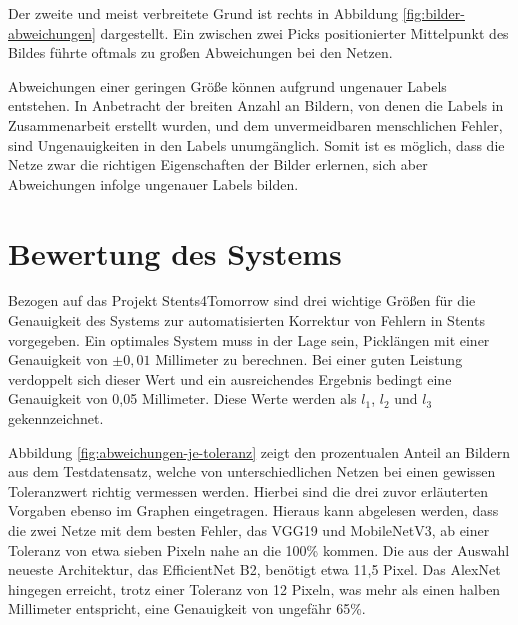 \mypar Der zweite und meist verbreitete Grund ist rechts in Abbildung \ref{fig:bilder-abweichungen} dargestellt. Ein zwischen zwei Picks positionierter Mittelpunkt des Bildes führte oftmals zu großen Abweichungen bei den Netzen.

\mypar Abweichungen einer geringen Größe können aufgrund ungenauer Labels entstehen. In Anbetracht der breiten Anzahl an Bildern, von denen die Labels in Zusammenarbeit erstellt wurden, und dem unvermeidbaren menschlichen Fehler, sind Ungenauigkeiten in den Labels unumgänglich. Somit ist es möglich, dass die Netze zwar die richtigen Eigenschaften der Bilder erlernen, sich aber Abweichungen infolge ungenauer Labels bilden. 


\section{Bewertung des Systems}\label{sec:bewertung-system-sec}
Bezogen auf das Projekt Stents4Tomorrow \cite{flechtmaschine} sind drei wichtige Größen für die Genauigkeit des Systems zur automatisierten Korrektur von Fehlern in Stents vorgegeben. Ein optimales System muss in der Lage sein, Picklängen mit einer Genauigkeit von $\pm 0,01$ Millimeter zu berechnen. Bei einer guten Leistung verdoppelt sich dieser Wert und ein ausreichendes Ergebnis bedingt eine Genauigkeit von 0,05 Millimeter. Diese Werte werden als $l_1$, $l_2$ und $l_3$ gekennzeichnet.

\mypar Abbildung \ref{fig:abweichungen-je-toleranz} zeigt den prozentualen Anteil an Bildern aus dem Testdatensatz, welche von unterschiedlichen Netzen bei einen gewissen Toleranzwert richtig vermessen werden. Hierbei sind die drei zuvor erläuterten Vorgaben ebenso im Graphen eingetragen. Hieraus kann abgelesen werden, dass die zwei Netze mit dem besten Fehler, das VGG19 und MobileNetV3, ab einer Toleranz von etwa sieben Pixeln nahe an die 100{\%} kommen. Die aus der Auswahl neueste Architektur, das EfficientNet B2, benötigt etwa 11,5 Pixel. Das AlexNet hingegen erreicht, trotz einer Toleranz von 12 Pixeln, was mehr als einen halben Millimeter entspricht, eine Genauigkeit von ungefähr 65{\%}.

